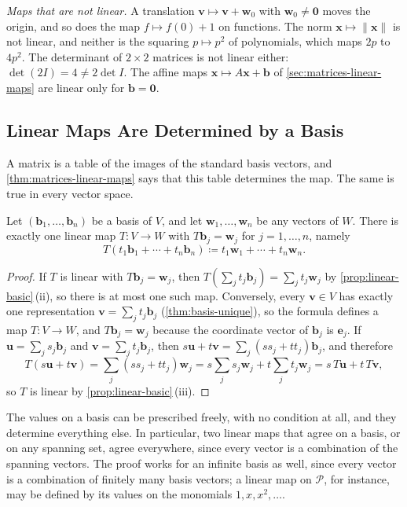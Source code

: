 \emph{Maps that are not linear.} A translation $\mathbf v\mapsto\mathbf v+\mathbf w_0$ with $\mathbf w_0\ne\mathbf 0$ moves the origin, and so does the map $f\mapsto f(0)+1$ on functions. The norm $\mathbf x\mapsto\|\mathbf x\|$ is not linear, and neither is the squaring $p\mapsto p^2$ of polynomials, which maps $2p$ to $4p^2$. The determinant of $2\times2$ matrices is not linear either: $\det(2I)=4\ne2\det I$. The affine maps $\mathbf x\mapsto A\mathbf x+\mathbf b$ of \cref{sec:matrices-linear-maps} are linear only for $\mathbf b=\mathbf 0$.

\subsection{Linear Maps Are Determined by a Basis}

A matrix is a table of the images of the standard basis vectors, and \cref{thm:matrices-linear-maps} says that this table determines the map. The same is true in every vector space.

\begin{theorem}
\label{thm:linear-map-basis}
Let $(\mathbf b_1,\ldots,\mathbf b_n)$ be a basis of $V$, and let $\mathbf w_1,\ldots,\mathbf w_n$ be any vectors of $W$. There is exactly one linear map $T\colon V\to W$ with $T\mathbf b_j=\mathbf w_j$ for $j=1,\ldots,n$, namely
\[
T(t_1\mathbf b_1+\cdots+t_n\mathbf b_n)\coloneqq t_1\mathbf w_1+\cdots+t_n\mathbf w_n .
\]
\end{theorem}

\begin{proof}
If $T$ is linear with $T\mathbf b_j=\mathbf w_j$, then $T(\sum_jt_j\mathbf b_j)=\sum_jt_j\mathbf w_j$ by \cref{prop:linear-basic}\,(ii), so there is at most one such map. Conversely, every $\mathbf v\in V$ has exactly one representation $\mathbf v=\sum_jt_j\mathbf b_j$ (\cref{thm:basis-unique}), so the formula defines a map $T\colon V\to W$, and $T\mathbf b_j=\mathbf w_j$ because the coordinate vector of $\mathbf b_j$ is $\mathbf e_j$. If $\mathbf u=\sum_js_j\mathbf b_j$ and $\mathbf v=\sum_jt_j\mathbf b_j$, then $s\mathbf u+t\mathbf v=\sum_j(ss_j+tt_j)\mathbf b_j$, and therefore
\[
T(s\mathbf u+t\mathbf v)=\sum_j(ss_j+tt_j)\mathbf w_j=s\sum_js_j\mathbf w_j+t\sum_jt_j\mathbf w_j=s\,T\mathbf u+t\,T\mathbf v,
\]
so $T$ is linear by \cref{prop:linear-basic}\,(iii).
\end{proof}

The values on a basis can be prescribed freely, with no condition at all, and they determine everything else. In particular, two linear maps that agree on a basis, or on any spanning set, agree everywhere, since every vector is a combination of the spanning vectors. The proof works for an infinite basis as well, since every vector is a combination of finitely many basis vectors; a linear map on $\mathcal P$, for instance, may be defined by its values on the monomials $1,x,x^2,\ldots$.

